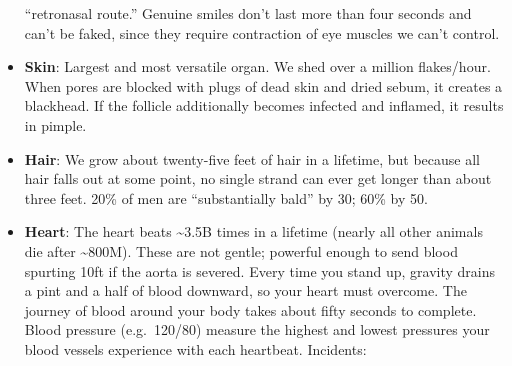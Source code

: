 \documentclass[
]{article}
\begin{document}
\begin{itemize}
  ``retronasal route.'' Genuine smiles don't last more than four seconds
  and can't be faked, since they require contraction of eye muscles we
  can't control.
\item
  \textbf{Skin}: Largest and most versatile organ. We shed over a
  million flakes/hour. When pores are blocked with plugs of dead skin
  and dried sebum, it creates a blackhead. If the follicle additionally
  becomes infected and inflamed, it results in pimple.
\item
  \textbf{Hair}: We grow about twenty-five feet of hair in a lifetime,
  but because all hair falls out at some point, no single strand can
  ever get longer than about three feet. 20\% of men are ``substantially
  bald'' by 30; 60\% by 50.
\item
  \textbf{Heart}: The heart beats \textasciitilde3.5B times in a
  lifetime (nearly all other animals die after \textasciitilde800M).
  These are not gentle; powerful enough to send blood spurting 10ft if
  the aorta is severed. Every time you stand up, gravity drains a pint
  and a half of blood downward, so your heart must overcome. The journey
  of blood around your body takes about fifty seconds to complete. Blood
  pressure (e.g.~120/80) measure the highest and lowest pressures your
  blood vessels experience with each heartbeat. Incidents:


\end{itemize}
\end{document}
